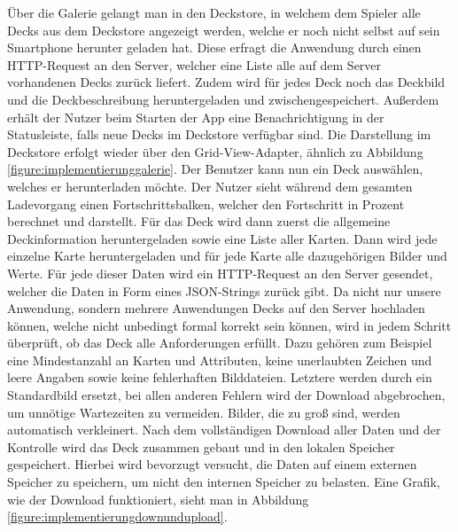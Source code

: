 Über die Galerie gelangt man in den Deckstore, in welchem dem Spieler alle Decks aus dem Deckstore angezeigt werden, welche er noch nicht selbst auf sein Smartphone herunter geladen hat. Diese erfragt die Anwendung durch einen HTTP-Request an den Server, welcher eine Liste alle auf dem Server vorhandenen Decks zurück liefert. Zudem wird für jedes Deck noch das Deckbild und die Deckbeschreibung heruntergeladen und zwischengespeichert. Außerdem erhält der Nutzer beim Starten der App eine Benachrichtigung in der Statusleiste, falls neue Decks im Deckstore verfügbar sind. Die Darstellung im Deckstore erfolgt wieder über den Grid-View-Adapter, ähnlich zu Abbildung \ref{figure:implementierunggalerie}. Der Benutzer kann nun ein Deck auswählen, welches er herunterladen möchte. Der Nutzer sieht während dem gesamten Ladevorgang einen Fortschrittsbalken, welcher den Fortschritt in Prozent berechnet und darstellt. Für das Deck wird dann zuerst die allgemeine Deckinformation heruntergeladen sowie eine Liste aller Karten. Dann wird jede einzelne Karte heruntergeladen und für jede Karte alle dazugehörigen Bilder und Werte. Für jede dieser Daten wird ein HTTP-Request an den Server gesendet, welcher die Daten in Form eines JSON-Strings zurück gibt. Da nicht nur unsere Anwendung, sondern mehrere Anwendungen Decks auf den Server hochladen können, welche nicht unbedingt formal korrekt sein können, wird in jedem Schritt überprüft, ob das Deck alle Anforderungen erfüllt. Dazu gehören zum Beispiel eine Mindestanzahl an Karten und Attributen, keine unerlaubten Zeichen und leere Angaben sowie keine fehlerhaften Bilddateien. Letztere werden durch ein Standardbild ersetzt, bei allen anderen Fehlern wird der Download abgebrochen, um unnötige Wartezeiten zu vermeiden. Bilder, die zu groß sind, werden automatisch verkleinert. Nach dem vollständigen Download aller Daten und der Kontrolle wird das Deck zusammen gebaut und in den lokalen Speicher gespeichert. Hierbei wird bevorzugt versucht, die Daten auf einem externen Speicher zu speichern, um nicht den internen Speicher zu belasten. Eine Grafik, wie der Download funktioniert, sieht man in Abbildung \ref{figure:implementierungdownundupload}.

